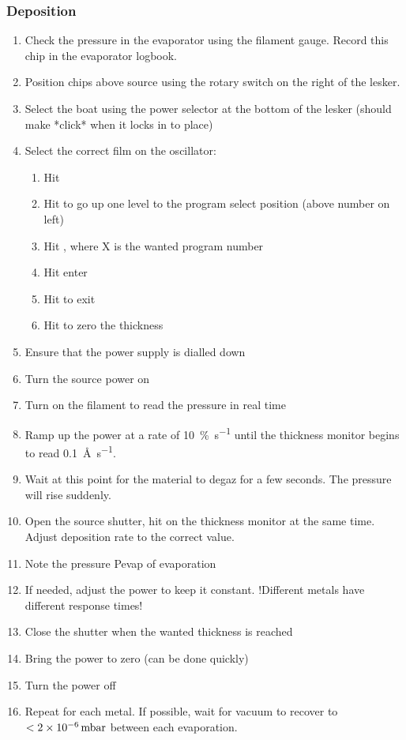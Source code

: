 \subsubsection{Deposition}
\begin{enumerate}[resume]
\item Check the pressure in the evaporator using the filament gauge. Record this chip in the evaporator logbook.
\item Position chips above source using the rotary switch on the right of the lesker.
\item Select the boat using the power selector at the bottom of the lesker (should make *click* when it locks in to place)
\item Select the correct film on the oscillator:
\begin{enumerate}
  \item Hit 
  \item Hit  to go up one level to the program select position (above number on left)
  \item Hit , where X is the wanted program number
  \item Hit enter 
  \item Hit  to exit
  \item Hit  to zero the thickness
\end{enumerate}
\item Ensure that the power supply is dialled down
\item Turn the source power on
\item Turn on the filament to read the pressure in real time
\item Ramp up the power at a rate of \SI{10}{\percent\per\second} until the thickness monitor begins to read \SI{0.1}{\angstrom\per\second}.
\item Wait at this point for the material to degaz for a few seconds. The pressure will rise suddenly.
\item Open the source shutter, hit  on the thickness monitor at the same time. Adjust deposition rate to the correct value. 
\item Note the pressure Pevap of evaporation
\item If needed, adjust the power to keep it constant. !Different metals have different response times! 
\item Close the shutter when the wanted thickness is reached
\item Bring the power to zero (can be done quickly)
\item Turn the power off
\item Repeat for each metal. If possible, wait for vacuum to recover to $< \SI{2d-6}{\milli\bar}$ between each evaporation.
\end{enumerate}

